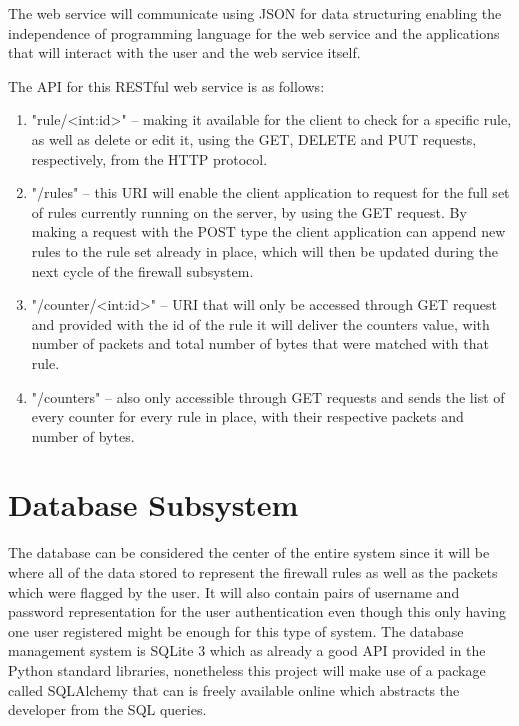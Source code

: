 The web service will communicate using JSON for data structuring enabling the
independence of programming language for the web service and the applications
that will interact with the user and the web service itself.

The API for this RESTful web service is as follows:
\begin{enumerate}
	\item "rule/<int:id>" -- making it available for the client to check for a
		specific rule, as well as delete or edit it, using the GET, DELETE and
		PUT requests, respectively, from the HTTP protocol.
	\item "/rules" -- this URI will enable the client application to request for
		the full set of rules currently running on the server, by using the GET
		request. By making a request with the POST type the client application
		can append new rules to the rule set already in place, which will then
		be updated during the next cycle of the firewall subsystem.
	\item "/counter/<int:id>" -- URI that will only be accessed through GET
		request and provided with the id of the rule it will deliver the
		counters value, with number of packets and total number of bytes that
		were matched with that rule.
	\item "/counters" -- also only accessible through GET requests and sends the
		list of every counter for every rule in place, with their respective
		packets and number of bytes.
\end{enumerate}


\section{Database Subsystem}
\label{chap4:sec:db-sys}
The database can be considered the center of the entire system since it will be
where all of the data stored to represent the firewall rules as well as the
packets which were flagged by the user. It will also contain pairs of username
and password representation for the user authentication even though this only
having one user registered might be enough for this type of system.
The database management system is SQLite 3 which as already a good API provided
in the Python standard libraries, nonetheless this project will make use of a
package called SQLAlchemy that can is freely available online which abstracts
the developer from the SQL queries.

